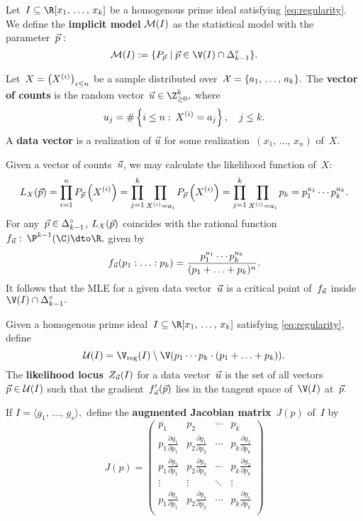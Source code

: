 \documentclass{article}
\begin{document}
  \begin{definition}
    Let~\(I \subseteq \R[x_1,\,\ldots,\,x_k]\)  be a  homogenous prime ideal satisfying \eqref{eq:regularity}. We define the \textbf{implicit model} \(\mathcal{M}(I)\) as the statistical model with the parameter~\(\vec p:\)
    \[
      \M(I) := \{P_{\p} \mid \p\in \V(I)\cap \od_{k-1}\}.
    \]
  \end{definition}

  \begin{definition}
    Let~\(X = \left(X^{(i)}\right)_{i\le n}\) be a sample distributed over~\(\mathcal{X} = \{a_1,\,\ldots,\,a_k\}.\) The \textbf{vector of counts} is the random vector~\(\u\in \Z^k_{\ge 0},\) where 
    \[
      u_j = \#\left\{i \le n:\:X^{(i)} = a_j\right\},\quad j \le k.
    \]
    A \textbf{data vector} is a realization of \(\vec u\) for some realization~\((x_1,\,\ldots,\,x_n)\) of~\(X.\)
  \end{definition}
  Given a vector of counts~\(\vec u\), we may calculate the likelihood function of~\(X:\)
  \[
    L_X(\vec p) = \prod_{i=1}^n P_{\vec p}\left(X^{(i)}\right)
      = \prod_{j=1}^k \prod_{X^{(i)} = a_i} P_{\vec p}\left(X^{(i)}\right)
      = \prod_{j=1}^k \prod_{X^{(i)} = a_i} p_k =  p_1^{u_1}\cdots p_k^{u_k}.
  \]
  For any~\(\vec p\in \Delta^\circ_{k-1}\), \(L_X(\vec p)\) coincides with the rational function~\(f_{\u}:\:\P^{k-1}(\C)\dto \R,\) given by
  \[
    f_{\vec u}(p_1:\ldots:p_k) = \frac{p_1^{u_1}\cdots p_k^{u_k}}{(p_1+\ldots+p_k)^{n}}.
  \]
  It follows that the MLE for a given data vector~\(\vec u\) is a critical point of~\(f_{\vec u}\) inside~\(\V(I)\cap \od_{k-1}.\)

  \begin{definition}
    Given a homogenous prime ideal~\(I \subseteq \R[x_1,\,\ldots,\,x_k]\) satisfying \eqref{eq:regularity}, define
    \[
      \U(I) = \Vreg(I)\setminus \V(p_1\cdots p_k\cdot (p_1 + \ldots + p_k)).
    \]
    The \textbf{likelihood locus}~\(Z_{\vec u}(I)\) for a data vector~\(\vec u\) is the set of all vectors~\(\vec p\in \mathcal{U}(I)\) such that the gradient~\(f_{\vec u}'(\vec p)\) lies in the tangent space of~\(\V(I)\) at~\(\vec p.\) 


  \end{definition}

  \begin{definition}
    If \(I = \langle g_1,\,\ldots,\,g_s\rangle,\) define the \textbf{augmented Jacobian matrix}~\(J(p)\) of~\(I\) by
    \[
      J(p) = 
      \begin{pmatrix}
      p_1 & p_2 & \cdots & p_k \\
      p_1 \frac{\partial g_1}{\partial p_1} & p_2 \frac{\partial g_1}{\partial p_2} & \cdots & p_k \frac{\partial g_1}{\partial p_k} \\
      p_1 \frac{\partial g_2}{\partial p_1} & p_2 \frac{\partial g_2}{\partial p_2} & \cdots & p_k \frac{\partial g_2}{\partial p_k} \\
      \vdots & \vdots & \ddots & \vdots \\
      p_1 \frac{\partial g_s}{\partial p_1} & p_2 \frac{\partial g_s}{\partial p_2} & \cdots & p_k \frac{\partial g_s}{\partial p_k} \\
      \end{pmatrix}
    \]
  \end{definition}
\end{document}
